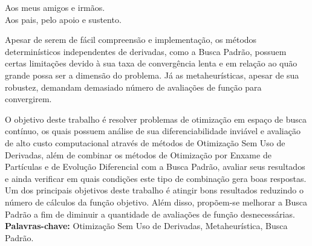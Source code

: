 \documentclass[a4paper,12pt]{monografia}
\theoremstyle{plain}
\theoremstyle{definition}
\theoremstyle{remark}
\begin{document}




\begin{dedicatoria}
	Aos meus amigos e irmãos.\\
	Aos pais, pelo apoio e sustento.\\
\end{dedicatoria}



Apesar de serem de fácil compreensão e implementação, os métodos determinísticos independentes de derivadas, como a Busca Padrão, possuem certas limitações devido à sua taxa de convergência lenta e em relação ao quão grande possa ser a dimensão do problema. Já as metaheurísticas, apesar de  sua  robustez,  demandam  demasiado  número  de  avaliações  de  função para  convergirem.

O objetivo deste trabalho é resolver problemas de otimização em espaço de busca contínuo, os quais possuem análise de sua diferenciabilidade inviável e avaliação de alto custo computacional através de métodos de Otimização Sem Uso de Derivadas, além de combinar os métodos de Otimização por Enxame de Partículas e de Evolução Diferencial com a Busca Padrão, avaliar seus resultados e ainda verificar em quais condições este
tipo de combinação gera boas respostas. Um dos principais objetivos deste trabalho é atingir bons resultados reduzindo o número de cálculos da função objetivo. Além disso, propõem-se melhorar a Busca Padrão a fim de diminuir a quantidade de avaliações de função desnecessárias.
\noindent \\ \textbf{Palavras-chave:} Otimização Sem Uso de Derivadas, Metaheurística, Busca Padrão.










\end{document}
